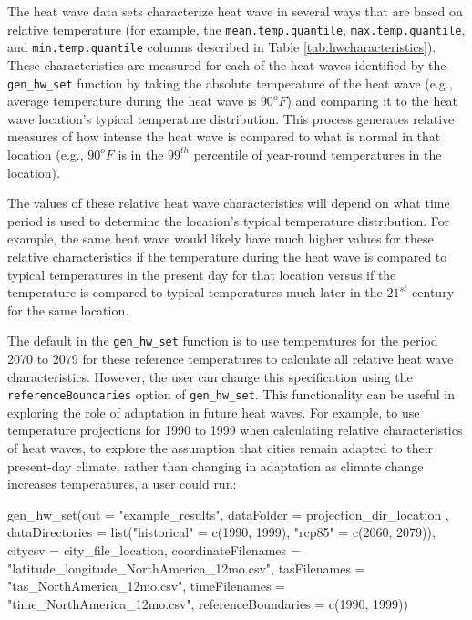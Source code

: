 The heat wave data sets characterize heat wave in several ways that are
based on relative temperature (for example, the
\texttt{mean.temp.quantile}, \texttt{max.temp.quantile}, and
\texttt{min.temp.quantile} columns described in Table
\ref{tab:hwcharacteristics}). These characteristics are measured for
each of the heat waves identified by the \texttt{gen\_hw\_set} function
by taking the absolute temperature of the heat wave (e.g., average
temperature during the heat wave is \(90^oF\)) and comparing it to the
heat wave location's typical temperature distribution. This process
generates relative measures of how intense the heat wave is compared to
what is normal in that location (e.g., \(90^oF\) is in the \(99^{th}\)
percentile of year-round temperatures in the location).

The values of these relative heat wave characteristics will depend on
what time period is used to determine the location's typical temperature
distribution. For example, the same heat wave would likely have much
higher values for these relative characteristics if the temperature
during the heat wave is compared to typical temperatures in the present
day for that location versus if the temperature is compared to typical
temperatures much later in the \(21^{st}\) century for the same
location.

The default in the \texttt{gen\_hw\_set} function is to use temperatures
for the period 2070 to 2079 for these reference temperatures to
calculate all relative heat wave characteristics. However, the user can
change this specification using the \texttt{referenceBoundaries} option
of \texttt{gen\_hw\_set}. This functionality can be useful in exploring
the role of adaptation in future heat waves. For example, to use
temperature projections for 1990 to 1999 when calculating relative
characteristics of heat waves, to explore the assumption that cities
remain adapted to their present-day climate, rather than changing in
adaptation as climate change increases temperatures, a user could run:

\begin{Schunk}
\begin{Sinput}
gen_hw_set(out = "example_results",
           dataFolder = projection_dir_location ,
           dataDirectories = list("historical" = c(1990, 1999),
                                        "rcp85" = c(2060, 2079)),
           citycsv = city_file_location,
           coordinateFilenames = "latitude_longitude_NorthAmerica_12mo.csv",
           tasFilenames = "tas_NorthAmerica_12mo.csv",
           timeFilenames = "time_NorthAmerica_12mo.csv",
           referenceBoundaries = c(1990, 1999))
\end{Sinput}
\end{Schunk}

